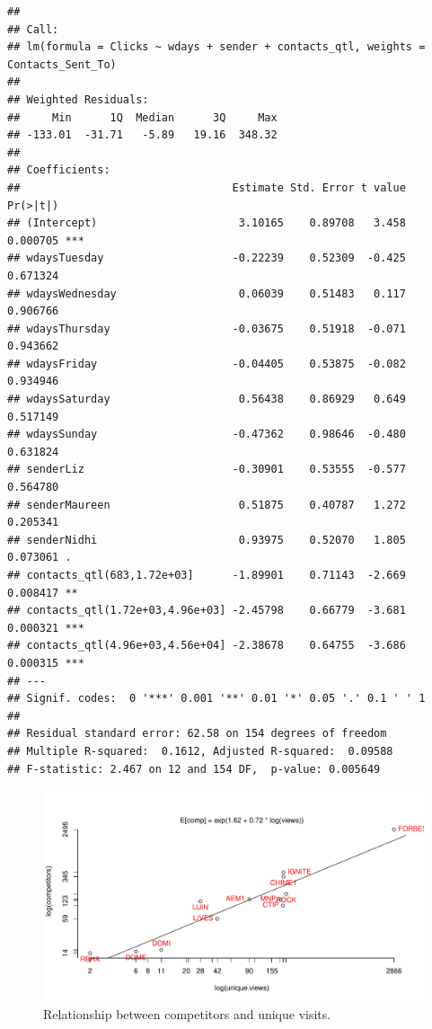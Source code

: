 \documentclass[12pt, titlepage]{article}
\begin{document}
\begin{verbatim}
## 
## Call:
## lm(formula = Clicks ~ wdays + sender + contacts_qtl, weights = Contacts_Sent_To)
## 
## Weighted Residuals:
##     Min      1Q  Median      3Q     Max 
## -133.01  -31.71   -5.89   19.16  348.32 
## 
## Coefficients:
##                                 Estimate Std. Error t value Pr(>|t|)    
## (Intercept)                      3.10165    0.89708   3.458 0.000705 ***
## wdaysTuesday                    -0.22239    0.52309  -0.425 0.671324    
## wdaysWednesday                   0.06039    0.51483   0.117 0.906766    
## wdaysThursday                   -0.03675    0.51918  -0.071 0.943662    
## wdaysFriday                     -0.04405    0.53875  -0.082 0.934946    
## wdaysSaturday                    0.56438    0.86929   0.649 0.517149    
## wdaysSunday                     -0.47362    0.98646  -0.480 0.631824    
## senderLiz                       -0.30901    0.53555  -0.577 0.564780    
## senderMaureen                    0.51875    0.40787   1.272 0.205341    
## senderNidhi                      0.93975    0.52070   1.805 0.073061 .  
## contacts_qtl(683,1.72e+03]      -1.89901    0.71143  -2.669 0.008417 ** 
## contacts_qtl(1.72e+03,4.96e+03] -2.45798    0.66779  -3.681 0.000321 ***
## contacts_qtl(4.96e+03,4.56e+04] -2.38678    0.64755  -3.686 0.000315 ***
## ---
## Signif. codes:  0 '***' 0.001 '**' 0.01 '*' 0.05 '.' 0.1 ' ' 1
## 
## Residual standard error: 62.58 on 154 degrees of freedom
## Multiple R-squared:  0.1612, Adjusted R-squared:  0.09588 
## F-statistic: 2.467 on 12 and 154 DF,  p-value: 0.005649
\end{verbatim}

\newpage

\begin{figure}
\centering
\includegraphics{report_notes_files/figure-latex/unnamed-chunk-5-1.pdf}
\caption{Relationship between competitors and unique visits.}
\end{figure}
\end{document}
